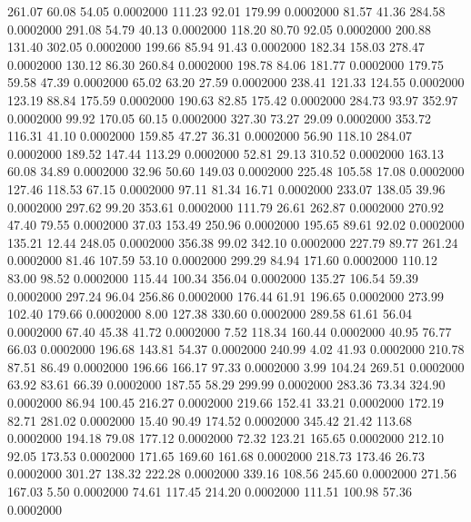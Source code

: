  261.07   60.08   54.05   0.0002000
 111.23   92.01  179.99   0.0002000
  81.57   41.36  284.58   0.0002000
 291.08   54.79   40.13   0.0002000
 118.20   80.70   92.05   0.0002000
 200.88  131.40  302.05   0.0002000
 199.66   85.94   91.43   0.0002000
 182.34  158.03  278.47   0.0002000
 130.12   86.30  260.84   0.0002000
 198.78   84.06  181.77   0.0002000
 179.75   59.58   47.39   0.0002000
  65.02   63.20   27.59   0.0002000
 238.41  121.33  124.55   0.0002000
 123.19   88.84  175.59   0.0002000
 190.63   82.85  175.42   0.0002000
 284.73   93.97  352.97   0.0002000
  99.92  170.05   60.15   0.0002000
 327.30   73.27   29.09   0.0002000
 353.72  116.31   41.10   0.0002000
 159.85   47.27   36.31   0.0002000
  56.90  118.10  284.07   0.0002000
 189.52  147.44  113.29   0.0002000
  52.81   29.13  310.52   0.0002000
 163.13   60.08   34.89   0.0002000
  32.96   50.60  149.03   0.0002000
 225.48  105.58   17.08   0.0002000
 127.46  118.53   67.15   0.0002000
  97.11   81.34   16.71   0.0002000
 233.07  138.05   39.96   0.0002000
 297.62   99.20  353.61   0.0002000
 111.79   26.61  262.87   0.0002000
 270.92   47.40   79.55   0.0002000
  37.03  153.49  250.96   0.0002000
 195.65   89.61   92.02   0.0002000
 135.21   12.44  248.05   0.0002000
 356.38   99.02  342.10   0.0002000
 227.79   89.77  261.24   0.0002000
  81.46  107.59   53.10   0.0002000
 299.29   84.94  171.60   0.0002000
 110.12   83.00   98.52   0.0002000
 115.44  100.34  356.04   0.0002000
 135.27  106.54   59.39   0.0002000
 297.24   96.04  256.86   0.0002000
 176.44   61.91  196.65   0.0002000
 273.99  102.40  179.66   0.0002000
   8.00  127.38  330.60   0.0002000
 289.58   61.61   56.04   0.0002000
  67.40   45.38   41.72   0.0002000
   7.52  118.34  160.44   0.0002000
  40.95   76.77   66.03   0.0002000
 196.68  143.81   54.37   0.0002000
 240.99    4.02   41.93   0.0002000
 210.78   87.51   86.49   0.0002000
 196.66  166.17   97.33   0.0002000
   3.99  104.24  269.51   0.0002000
  63.92   83.61   66.39   0.0002000
 187.55   58.29  299.99   0.0002000
 283.36   73.34  324.90   0.0002000
  86.94  100.45  216.27   0.0002000
 219.66  152.41   33.21   0.0002000
 172.19   82.71  281.02   0.0002000
  15.40   90.49  174.52   0.0002000
 345.42   21.42  113.68   0.0002000
 194.18   79.08  177.12   0.0002000
  72.32  123.21  165.65   0.0002000
 212.10   92.05  173.53   0.0002000
 171.65  169.60  161.68   0.0002000
 218.73  173.46   26.73   0.0002000
 301.27  138.32  222.28   0.0002000
 339.16  108.56  245.60   0.0002000
 271.56  167.03    5.50   0.0002000
  74.61  117.45  214.20   0.0002000
 111.51  100.98   57.36   0.0002000
